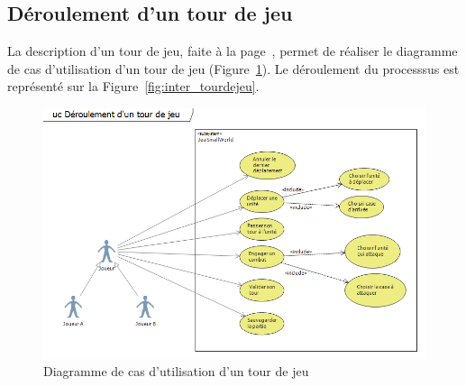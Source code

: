 \documentclass[a4paper]{article}%
\begin{document}


\subsection{Déroulement d'un tour de jeu}
La description d'un tour de jeu, faite à la page~\pageref{tourdejeu}, permet de réaliser le diagramme de cas d'utilisation d'un tour de jeu (Figure~\ref{fig:cas_tourdejeu}). Le déroulement du processsus est représenté sur la Figure~\ref{fig:inter_tourdejeu}.

\begin{figure}[H]
    \centering
    \includegraphics[width=\textwidth]{./images/cas_dutilisation/tourdejeu.png}
		\caption{Diagramme de cas d'utilisation d'un tour de jeu}
		\label{fig:cas_tourdejeu}
\end{figure}
\end{document}
